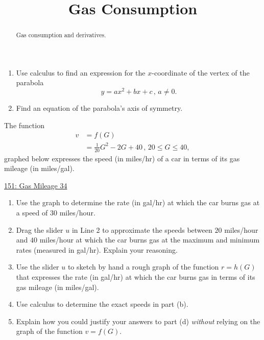 \documentclass{ximera}
\title{Gas Consumption}
\begin{document}
\begin{abstract}
Gas consumption and derivatives.
\end{abstract}
\maketitle


\begin{question}  \label{Qkdfjeregd}
\begin{enumerate}

\item Use calculus to find an expression for the $x$-coordinate of the vertex of the parabola
\[
    y = ax^2 + bx + c \, , \, a\neq 0.
\]

\item Find an equation of the parabola's axis of symmetry.

\end{enumerate}
\end{question}

\begin{question} \label{Qghlfgvnhhgeyghhg}
The function 
\begin{align*}
    v  &= f(G)    \\
         &= \frac{1}{20}G^2 - 2G + 40 \, , \, 20\leq G \leq 40 ,
\end{align*}
graphed below expresses the speed (in miles/hr) of a car in terms of its gas mileage (in miles/gal).

\begin{onlineOnly}
    \begin{center}
\end{center}
\end{onlineOnly}

\href{https://www.desmos.com/calculator/lkxc2lxrvz}{151: Gas Mileage 34}

\begin{enumerate}
\item Use the graph to determine the rate (in gal/hr) at which the car burns gas at a speed of $30$ miles/hour.

\item Drag the slider $u$ in Line 2 to approximate the speeds between $20$ miles/hour and $40$ miles/hour at which the car burns gas at the maximum and minimum rates (measured in gal/hr). Explain your reasoning.

\item Use the slider $u$ to sketch by hand a rough graph of the function $r=h(G)$ that expresses the rate (in gal/hr) at which the car burns gas in terms of its gas mileage (in miles/gal).

\item Use calculus to determine the exact speeds in part (b). 

\item Explain how you could justify your answers to part (d) \emph{without} relying on the graph of the function $v=f(G)$.
\end{enumerate}


\end{question}
\end{document}
